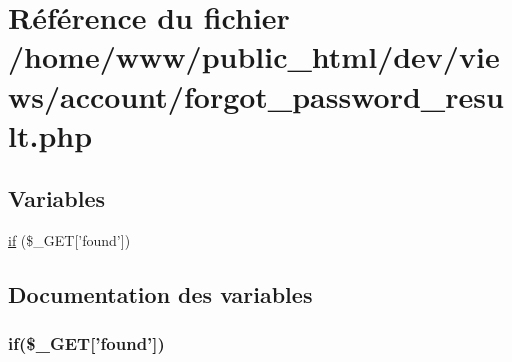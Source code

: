 \hypertarget{forgot__password__result_8php}{\section{Référence du fichier /home/www/public\-\_\-html/dev/views/account/forgot\-\_\-password\-\_\-result.php}
\label{forgot__password__result_8php}
}
\subsection*{Variables}
\begin{DoxyCompactItemize}
\item 
\hyperlink{forgot__password__result_8php_ab625f12aec73d0a4f0bc8286f088ec1f}{if} (\$\-\_\-\-G\-E\-T\mbox{[}'found'\mbox{]})
\end{DoxyCompactItemize}


\subsection{Documentation des variables}
\hypertarget{forgot__password__result_8php_ab625f12aec73d0a4f0bc8286f088ec1f}{
\subsubsection[{if}]{\setlength{\rightskip}{0pt plus 5cm}if(\$\-\_\-\-G\-E\-T\mbox{[}'found'\mbox{]})}}\label{forgot__password__result_8php_ab625f12aec73d0a4f0bc8286f088ec1f}
